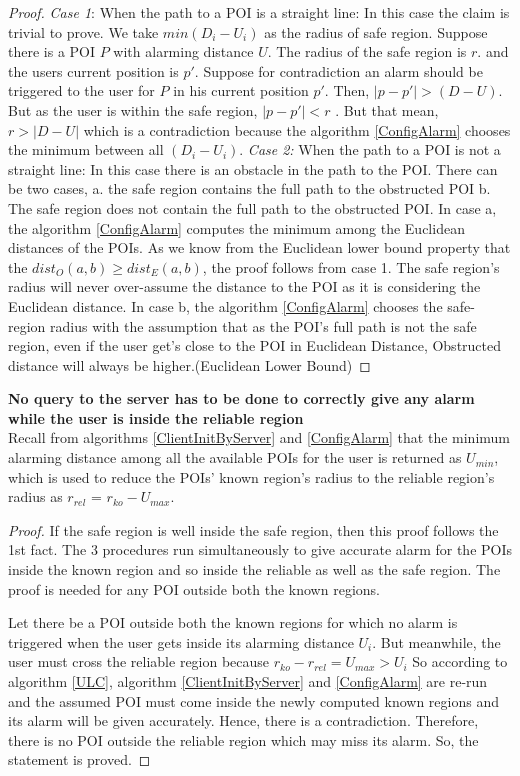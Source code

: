 \documentclass{sig-alternate}
\begin{document}
\begin{proof}
\textit{Case 1}: When the path to a POI is a straight line: 
In this case the claim is trivial to prove. We take $min( D_i - U_i )$ as the radius of safe region. Suppose there is a POI $P$ with alarming distance $U$. The radius of the safe region is $r$. and the users current position is $p'$. Suppose for contradiction an alarm should be triggered to the user for $P$ in his current position $p'$. Then, $|p-p'|>(D-U)$. But as the user is within the safe region, $|p-p'|<r$ . But that mean, $r>|D-U|$ which is a contradiction because the algorithm \ref{ConfigAlarm} chooses the minimum between all $(D_i - U_i )$.
\textit{Case 2:} When the path to a POI is not a straight line: 
In this case there is an obstacle in the path to the POI. There can be two cases, 
a. the safe region contains the full path to the obstructed POI 
b. The safe region does not contain the full path to the obstructed POI.
In case a, the algorithm \ref{ConfigAlarm} computes the minimum among the Euclidean distances of the POIs. As we know from the Euclidean lower bound property that the $dist_O(a,b) \geqslant dist_E(a,b)$, the proof follows from case 1. The safe region's radius will never over-assume the distance to the POI as it is considering the Euclidean distance.
In case b, the algorithm \ref{ConfigAlarm} chooses the safe-region radius with the assumption that as the POI's full path is not the safe region, even if the user get's close to the POI in Euclidean Distance, Obstructed distance will always be higher.(Euclidean Lower Bound)
\end{proof}

\textbf{No query to the server has to be done to correctly give any alarm while the user is inside the reliable region}\\
Recall from algorithms \ref{ClientInitByServer} and \ref{ConfigAlarm} that the minimum alarming distance among all the available POIs for the user is returned as $U_{min}$, which is used to reduce the POIs' known region's radius to the reliable region's radius as $r_{rel}$ = $r_{ko} - U_{max}$.

\begin{proof}
If the safe region is well inside the safe region, then this proof follows the 1st fact.
The 3 procedures run simultaneously to give accurate alarm for the POIs inside the known region and so inside the reliable as well as the safe region.
The proof is needed for any POI outside both the known regions.

Let there be a POI outside both the known regions for which no alarm is triggered when the user gets inside its alarming distance $U_i$. 
But meanwhile, the user must cross the reliable region because $r_{ko} - r_{rel} = U_{max} > U_i$ 
So according to algorithm \ref{ULC}, algorithm \ref{ClientInitByServer} and \ref{ConfigAlarm} are re-run and the assumed POI must come inside the newly computed known regions and its alarm will be given accurately.
Hence, there is a contradiction.
Therefore, there is no POI outside the reliable region which may miss its alarm.
So, the statement is proved.
\end{proof}
\end{document}

